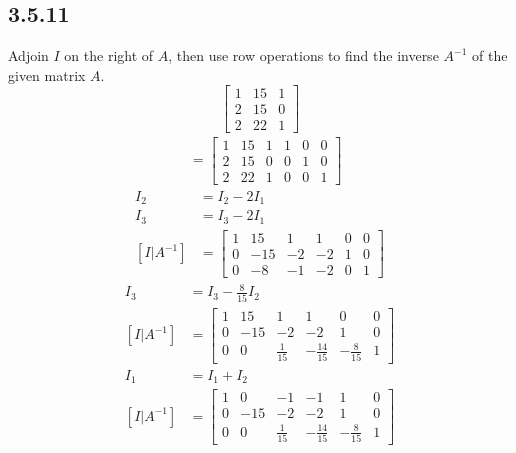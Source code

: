 \documentclass{article}
\begin{document}
\subsection{3.5.11}
Adjoin $ I $ on the right of $ A $, then use row operations to find the inverse $ A^{-1} $ of the given matrix $ A $.
\begin{equation*}
	\begin{bmatrix}
		1 & 15 & 1 \\
		2 & 15 & 0 \\
		2 & 22 & 1
	\end{bmatrix}
\end{equation*}
\begin{align*}
	[I|A^{-1}] & =
		\left[ \begin{array}{ccc|ccc}
			1 & 15 & 1 & 1 & 0 & 0 \\
			2 & 15 & 0 & 0 & 1 & 0 \\
			2 & 22 & 1 & 0 & 0 & 1
		\end{array} \right]
\end{align*}
\begin{align*}
	I_2 & = I_2 - 2I_1 \\
	I_3 & = I_3 - 2I_1 \\
	[I|A^{-1}] & =
		\left[ \begin{array}{ccc|ccc}
			1 & 15 & 1 & 1 & 0 & 0 \\
			0 & -15 & -2 & -2 & 1 & 0 \\
			0 & -8 & -1 & -2 & 0 & 1
		\end{array} \right]
\end{align*}
\begin{align*}
	I_3 & = I_3 - \frac{8}{15}I_2 \\
	[I|A^{-1}] & =
		\left[ \begin{array}{ccc|ccc}
			1 & 15 & 1 & 1 & 0 & 0 \\
			0 & -15 & -2 & -2 & 1 & 0 \\
			0 & 0 & \frac{1}{15} & -\frac{14}{15} & -\frac{8}{15} & 1
		\end{array} \right]
\end{align*}
\begin{align*}
	I_1 & = I_1 + I_2 \\
	[I|A^{-1}] & =
		\left[ \begin{array}{ccc|ccc}
			1 & 0 & -1 & -1 & 1 & 0 \\
			0 & -15 & -2 & -2 & 1 & 0 \\
			0 & 0 & \frac{1}{15} & -\frac{14}{15} & -\frac{8}{15} & 1
		\end{array} \right]
\end{align*}
\end{document}
